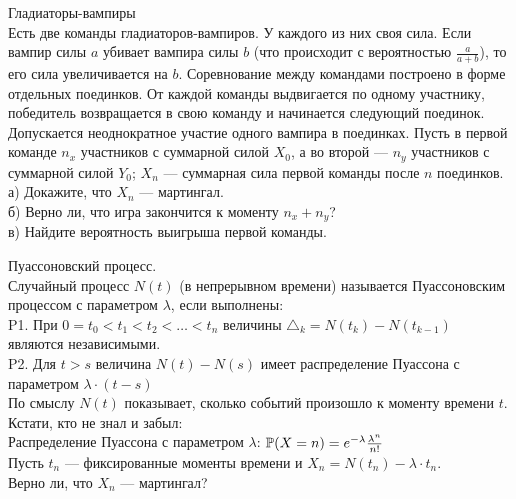 \begin{problem}
 Гладиаторы-вампиры \\
Есть две команды гладиаторов-вампиров. У каждого из них своя сила.
Если вампир силы $a$ убивает вампира силы $b$ (что происходит с
вероятностью $\frac{a}{a+b}$), то его сила увеличивается на $b$.
Соревнование между командами построено в форме отдельных
поединков. От каждой команды выдвигается по одному участнику,
победитель возвращается в свою команду и начинается следующий
поединок. Допускается неоднократное участие одного вампира в
поединках. Пусть в первой команде $n_{x}$ участников с суммарной
силой $X_{0}$, а во второй --- $n_{y}$ участников с суммарной силой
$Y_{0}$; $X_{n}$ --- суммарная сила первой команды после $n$
поединков. \\
а) Докажите, что $X_{n}$ --- мартингал. \\
б) Верно ли, что игра закончится к моменту $n_{x}+n_{y}$? \\
в) Найдите вероятность выигрыша первой команды. 
\end{problem} 
\begin{solution} 

\end{solution}

\begin{problem}
 Пуассоновский процесс. \\
Случайный процесс $N(t)$ (в непрерывном времени) называется
Пуассоновским
процессом с параметром $\lambda$, если выполнены: \\
P1. При $0=t_{0}<t_{1}<t_{2}<\ldots<t_{n}$ величины
$\triangle_{k}=N(t_{k})-N(t_{k-1})$ являются независимыми. \\
P2. Для $t>s$ величина $N(t)-N(s)$ имеет распределение Пуассона с
параметром $\lambda \cdot (t-s)$ \\
По смыслу $N(t)$ показывает, сколько событий произошло к моменту
времени $t$. \\
Кстати, кто не знал и забыл: \\
Распределение Пуассона с параметром $\lambda$:
$\P(X=n)=e^{-\lambda}\frac{\lambda^{n}}{n!}$ \\
Пусть $t_{n}$ --- фиксированные моменты времени и
$X_{n}=N(t_{n})-\lambda\cdot t_{n}$. \\
Верно ли, что $X_{n}$ --- мартингал? 
\end{problem} 
\begin{solution} 

\end{solution}

